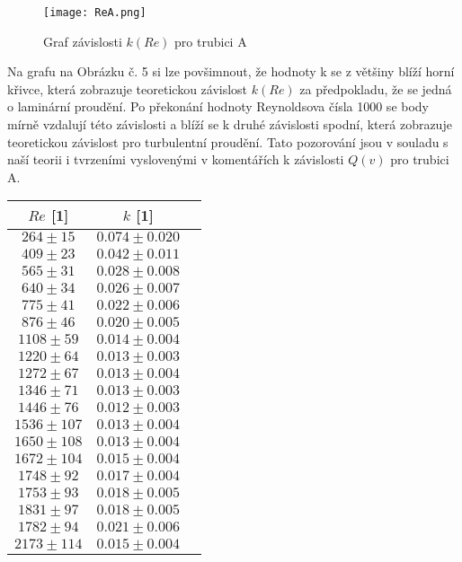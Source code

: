 \documentclass[a4paper]{article}
\begin{document}
\begin{figure}[H]
\centering
\texttt{[image: ReA.png]}
\caption{Graf závislosti $k(Re)$ pro trubici A}
\end{figure}
\par Na grafu na Obrázku č. 5 si lze povšimnout, že hodnoty k se z většiny blíží horní křivce, která zobrazuje teoretickou závislost $k(Re)$ za předpokladu, že se jedná o laminární proudění. Po překonání hodnoty Reynoldsova čísla 1000 se body mírně vzdalují této závislosti a blíží se k druhé závislosti spodní, která zobrazuje teoretickou závislost pro turbulentní proudění. Tato pozorování jsou v souladu s naší teorii i tvrzeními vyslovenými v komentářích k závislosti $Q(v)$ pro trubici A.
\begin{center}
    \label{tab:title}
    \begin{tabular}{ | c | c |  p{3cm} |} \hline
    $Re$ [1] & $k$ [1]    \\  \hline
    $264\pm15$  & $0.074\pm0.020$ \\ \hline
    $409\pm23$  & $0.042\pm0.011$ \\ \hline
    $565\pm31$  & $0.028\pm0.008$ \\ \hline
    $640\pm34$  & $0.026\pm0.007$ \\ \hline
    $775\pm41$  & $0.022\pm0.006$ \\ \hline
    $876\pm46$  & $0.020\pm0.005$ \\ \hline
    $1108\pm59$  & $0.014\pm0.004$ \\ \hline
    $1220\pm64$  & $0.013\pm0.003$ \\ \hline
    $1272\pm67$  & $0.013\pm0.004$ \\ \hline
    $1346\pm71$  & $0.013\pm0.003$ \\ \hline
    $1446\pm76$  & $0.012\pm0.003$ \\ \hline
    $1536\pm107$ & $0.013\pm0.004$ \\ \hline
    $1650\pm108$ & $0.013\pm0.004$ \\ \hline   
    $1672\pm104$ & $0.015\pm0.004$ \\ \hline
    $1748\pm92$  & $0.017\pm0.004$ \\ \hline
    $1753\pm93$  & $0.018\pm0.005$ \\ \hline
    $1831\pm97$  & $0.018\pm0.005$ \\ \hline
    $1782\pm94$  & $0.021\pm0.006$ \\ \hline
    $2173\pm114$ & $0.015\pm0.004$ \\ \hline
\end{tabular}
\end{center}
\end{document}
